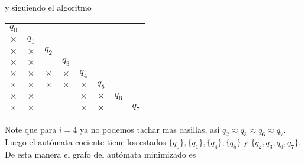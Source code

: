 \begin{itemize}
\begin{center}
\begin{tabular}{c||c|c}
                \end{tabular}
            \end{center}
            y siguiendo el algoritmo
            \begin{center}
                \begin{tabular}{cccccccc}
                   $q_0$ \\ \cline{1-1}
                   \multicolumn{1}{|c|}{$\times$} & $q_1$ \\ \cline{1-2}
                   \multicolumn{1}{|c|}{$\times$} & \multicolumn{1}{|c|}{$\times$} & $q_2$ \\ \cline{1-3}
                   \multicolumn{1}{|c|}{$\times$} & \multicolumn{1}{|c|}{$\times$} & \multicolumn{1}{|c|}{} & $q_3$\\ \cline{1-4}
                   \multicolumn{1}{|c|}{$\times$} & \multicolumn{1}{|c|}{$\times$} & \multicolumn{1}{|c|}{$\times$} & \multicolumn{1}{|c|}{$\times$} & $q_4$ \\ \cline{1-5}
                   \multicolumn{1}{|c|}{$\times$} & \multicolumn{1}{|c|}{$\times$} & \multicolumn{1}{|c|}{$\times$} & \multicolumn{1}{|c|}{$\times$} & \multicolumn{1}{|c|}{$\times$} & $q_5$ \\ \cline{1-6}
                   \multicolumn{1}{|c|}{$\times$} & \multicolumn{1}{|c|}{$\times$} & \multicolumn{1}{|c|}{} & \multicolumn{1}{|c|}{} & \multicolumn{1}{|c|}{$\times$} & \multicolumn{1}{|c|}{$\times$} & $q_6$ \\ \cline{1-7}
                   \multicolumn{1}{|c|}{$\times$} & \multicolumn{1}{|c|}{$\times$} & \multicolumn{1}{|c|}{} & \multicolumn{1}{|c|}{} & \multicolumn{1}{|c|}{$\times$} & \multicolumn{1}{|c|}{$\times$} & \multicolumn{1}{|c|}{} & $q_7$ \\ \cline{1-7}
                \end{tabular}
            \end{center}
            Note que para $i=4$ ya no podemos tachar mas casillas, así $q_2\approx q_3 \approx q_6 \approx q_7.$ Luego el autómata cociente tiene los estados $\{q_0\},\{q_1\},\{q_4\}, \{q_5\}$ y $\{q_2,q_3,q_6,q_7\}.$ De esta manera el grafo del autómata minimizado es
            
         \begin{basedtikz}
             \centering
         \end{basedtikz}


\end{itemize}
